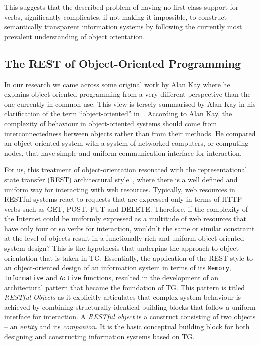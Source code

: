 \documentclass[a4paper,12pt,oneside,openright,final]{memoir} %
\begin{document}
	This suggests that the described problem of having no first-class support for verbs, significantly complicates, if not making it impossible, to construct semantically transparent information systems by following the currently most prevalent understanding of object orientation.

\subsection*{The REST of Object-Oriented Programming}	
	
	In our research we came across some original work by Alan Kay where he explains object-oriented programming from a very different perspective than the one currently in common use.
	This view is tersely summarised by Alan Kay in his clarification of the term ``object-oriented'' in~\cite{Kay2003}.
	According to Alan Kay, the complexity of behaviour in object-oriented systems should come from interconnectedness between objects rather than from their methods.
	He compared an object-oriented system with a system of networked computers, or computing nodes, that have simple and uniform communication interface for interaction.
	
	For us, this treatment of object-orientation resonated with the representational state transfer (REST) architectural style~\cite{Fielding2000}, where there is a well defined and uniform way for interacting with web resources.
	Typically, web resources in RESTful systems react to requests that are expressed only in terms of HTTP verbs such as GET, POST, PUT and DELETE.
	Therefore, if the complexity of the Internet could be uniformly expressed as a multitude of web resources that have only four or so verbs for interaction, wouldn't the same or similar constraint at the level of objects result in a functionally rich and uniform object-oriented system design?
	This is the hypothesis that underpins the approach to object orientation that is taken in TG.
	Essentially, the application of the REST style to an object-oriented design of an information system in terms of its \texttt{Memory}, \texttt{Informative} and \texttt{Active} functions, resulted in the development of an architectural pattern that became the foundation of TG.
	This pattern is titled \emph{RESTful Objects} as it explicitly articulates that complex system behaviour is achieved by combining structurally identical building blocks that follow a uniform interface for interaction.
	A \emph{RESTful object} is a construct consisting of two objects -- an \emph{entity} and its \emph{companion}.
	It is the basic conceptual building block for both designing and constructing information systems based on TG.
	
\end{document}
